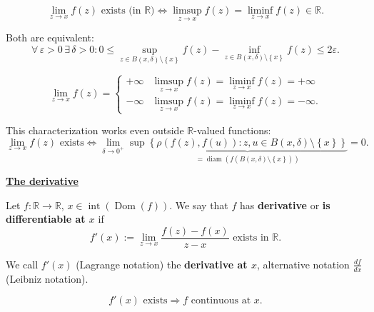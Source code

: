 \documentclass{notes}
\begin{document}
  \begin{lem}
    \[
      \lim_{z \to x} f(z) \text{ exists (in $\mathbb R$)} \Leftrightarrow \limsup_{z \to x} f(z) = \liminf_{z \to x} f(z) \in \mathbb R.
    \]
  \end{lem}
  
  \begin{prf}
    Both are equivalent: 
    \[
      \forall \, \varepsilon > 0 \, \exists \, \delta > 0: 0 \leq \sup_{z \in B(x, \delta) \setminus \left \{ x \right \}} f(z) - \inf_{z \in B(x, \delta) \setminus \left \{ x \right \}} f(z) \leq 2 \varepsilon.
    \]
  \end{prf}
  
  \begin{defn}
    \[
      \lim_{z \to x} f(z) = \begin{cases}
        +\infty & \limsup_{z \to x} f(z) = \liminf_{z \to x} f(z) = +\infty \\
        -\infty & \limsup_{z \to x} f(z) = \liminf_{z \to x} f(z) = -\infty.
      \end{cases}
    \]
  \end{defn}
  
  \begin{note}
    This characterization works even outside $\mathbb R$-valued functions:
    \[
      \lim_{z \to x} f(z) \text{ exists} \Leftrightarrow \lim_{\delta \to 0^+} \sup \underbrace{\left \{ \rho(f(z), f(u)) : z, u \in B(x, \delta) \setminus \left \{ x \right \} \right \}}_{= \operatorname{diam}(f(B(x, \delta) \setminus \left \{ x \right \}))} = 0.
    \]
  \end{note}
  
  \newpage
  
  \underline{\boldmath \bfseries The derivative}

  \begin{defn}
    Let $f \colon \mathbb R \to \mathbb R$, $x \in \operatorname{int} (\operatorname{Dom}(f))$.
    We say that $f$ has {\boldmath \bfseries derivative} or {\boldmath \bfseries is differentiable at $x$} if 
    \[
      f'(x) := \lim_{z \to x} \frac{f(z) - f(x)}{z - x} \text{ exists in $\mathbb R$}.
    \]
    
    We call $f'(x)$ (Lagrange notation) the {\boldmath \bfseries derivative at $x$}, alternative notation $\frac{df}{dx}$ (Leibniz notation).
  \end{defn}
  
  \begin{lem}
    \[
      f'(x) \text{ exists} \Rightarrow \text{$f$ continuous at $x$}.
    \]
  \end{lem}
  
\end{document}
